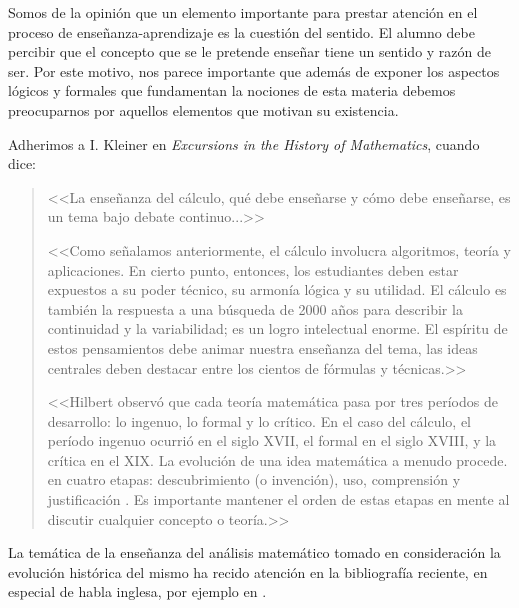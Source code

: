 \documentclass[a4paper, 12pt]{article}
\begin{document}
\begin{itemize}
Somos de la opinión que un elemento importante para prestar atención en el proceso de enseñanza-aprendizaje es la cuestión del sentido. El alumno debe percibir que el concepto que se le pretende enseñar tiene un sentido y razón de ser. Por este motivo,  nos parece importante que además de exponer los aspectos lógicos y formales que fundamentan la nociones de esta materia debemos preocuparnos por aquellos elementos que motivan su existencia. 

Adherimos a I. Kleiner en \emph{Excursions in the History of Mathematics}, cuando dice:

\begin{quote}
<<La enseñanza del cálculo, qué debe enseñarse y cómo debe enseñarse, es
un tema bajo debate continuo...>>

<<Como señalamos anteriormente, el cálculo involucra algoritmos, teoría y aplicaciones.
En cierto punto, entonces, los estudiantes deben estar expuestos a su poder técnico, su 
armonía lógica  y su utilidad. El cálculo es también la respuesta a una búsqueda de 2000 años para describir la continuidad y la variabilidad; es un logro intelectual enorme. El espíritu de estos pensamientos debe animar nuestra enseñanza del tema, las ideas centrales deben destacar entre los cientos de fórmulas y técnicas.>>

<<Hilbert observó que cada teoría matemática pasa por tres períodos de
desarrollo: lo ingenuo, lo formal y lo crítico. En el caso del cálculo, el
período ingenuo ocurrió en el siglo XVII, el formal en el siglo XVIII, y
la crítica en el XIX. La evolución de una idea matemática a menudo procede.
en cuatro etapas: descubrimiento (o invención), uso, comprensión y justificación . Es importante mantener el orden de estas etapas en mente al discutir cualquier concepto o teoría.>>
\end{quote}

La temática de la enseñanza del análisis matemático tomado en consideración  la evolución histórica del mismo ha recido atención en la bibliografía reciente, en especial de habla inglesa, por ejemplo en \cite{bressoud2008radical,hawkins2001lebesgue, bressoud2007radical,abbott2002understanding,hairer2008analysis}.


\end{itemize}
\end{document}

